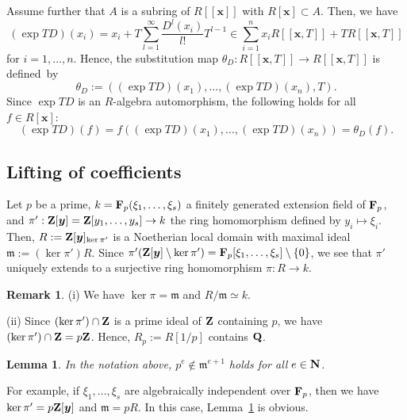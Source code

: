 \documentclass{amsart}
\theoremstyle{plain}
\newtheorem{lem}[thm]{Lemma}
\theoremstyle{definition}
\newtheorem{rem}[thm]{Remark}
\newcommand{\fm }{{\mathfrak{m}}}
\newcommand{\zs}{\{ 0\} }
\newcommand{\sm}{\setminus}
\newcommand{\nd}{\noindent}
\newcommand{\F}{{\bf F}}
\newcommand{\Q}{{\bf Q}}
\newcommand{\Z}{{\bf Z}}
\newcommand{\N}{{\bf N}}
\newcommand{\x}{{\boldsymbol x}}
\newcommand{\y}{{\boldsymbol y}}
\newcommand{\Rx}{R[\x]}
\begin{document}
Assume further that $A$ is a subring of $R[[\x ]]$ with $\Rx \subset A$. 
Then, we have 
\begin{equation}\label{eq:exp continuous}
(\exp TD)(x_i)=x_i+T\sum _{l=1}^{\infty }\dfrac{D^l(x_i)}{l!}T^{l-1}
\in \sum _{i=1}^nx_iR[[\x ,T]]+TR[[\x ,T]] 
\end{equation}
for $i=1,\ldots ,n$. 
Hence, 
the substitution map $\theta _D:R[[\x ,T]]\to R[[\x ,T]]$ is defined~by 
\begin{equation}\label{eq:exp TD map}
\theta _D:=((\exp TD)(x_1),\ldots ,(\exp TD)(x_n),T). 
\end{equation}
Since $\exp TD$ is an $R$-algebra automorphism, 
the following holds for all $f\in \Rx $: 
\begin{equation}\label{eq:rem:theta_D}
(\exp TD)(f)=f((\exp TD)(x_1),\ldots ,(\exp TD)(x_n))
=\theta _D(f).
\end{equation}



\subsection{Lifting of coefficients}\label{sect:Lift}


Let $p$ be a prime, 
$k=\F _p(\xi _1,\ldots ,\xi _s)$ 
a finitely generated extension field of $\F _p$, 
and $\pi ':\Z [\y ]=\Z [y_1,\ldots ,y_s]
\to k$ the ring homomorphism 
defined by $y_i\mapsto \xi _i$. 
Then, 
$R:=\Z [\y ]_{\ker \pi '}$ 
is a Noetherian local domain with maximal ideal 
$\mathfrak{m}:=(\ker \pi ')R$. 
Since $\pi '(\Z [\y ]\sm \ker \pi ')=\F _p[\xi _1,\ldots ,\xi _s]\sm \zs $, 
we see that 
$\pi '$ uniquely extends to a surjective ring homomorphism $\pi :R\to k$. 


\begin{rem}\label{rem:RLR}\rm 
(i) We have $\ker \pi =\mathfrak{m}$ 
and $R/\mathfrak{m}\simeq k$. 

\nd (ii) 
Since $(\ker \pi ')\cap \Z $ 
is a prime ideal of $\Z $ containing $p$, 
we have $(\ker \pi ')\cap \Z =p\Z $. 
Hence, $R_p:=R[1/p]$ contains $\Q $. 
\end{rem}


\begin{lem}\label{lem:RLR}
In the notation above, 
$p^e\not\in \fm ^{e+1}$ holds for all $e\in \N $. 
\end{lem}


For example, 
if $\xi _1,\ldots ,\xi _s$ are algebraically independent over $\F _p$, 
then we have 
$\ker \pi '=p\Z [\y ]$ and $\mathfrak{m}=pR$. 
In this case, Lemma~\ref{lem:RLR} is obvious. 
\end{document}
